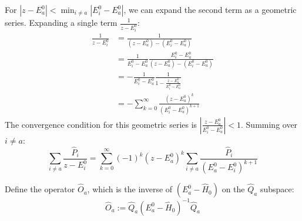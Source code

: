 For $|z-E_a^0|<\min_{i\neq a}|E_i^0-E_a^0|$, we can expand the second
term as a geometric series. Expanding a single term $\frac{1}{z-E_i^0}$:
\begin{align} \label{eq:geometric_series_expansion}
  \frac{1}{z-E_i^0}
  &= \frac{1}{(z-E_a^0) - (E_i^0 - E_a^0)} \\
  &= \frac{1}{E_i^0 - E_a^0} \frac{E_i^0 - E_a^0}{(z-E_a^0) -
  (E_i^0 - E_a^0)} \\
  &= -\frac{1}{E_i^0 - E_a^0} \frac{1}{1-\frac{z-E_a^0}{E_i^0-E_a^0}} \\
  &= -\sum_{k=0}^\infty \frac{(z-E_a^0)^k}{(E_i^0-E_a^0)^{k+1}}
\end{align}
The convergence condition for this geometric series is
$\left|\frac{z-E_a^0}{E_i^0-E_a^0}\right| < 1$.
Summing over $i \ne a$:
\begin{equation} \label{eq:G0_sum_expansion}
  \sum_{i\neq a}\frac{\hat P_i}{z-E_i^0}
  =\sum_{k=0}^\infty (-1)^k (z-E_a^0)^k
  \sum_{i\neq a}\frac{\hat P_i}{(E_a^0-E_i^0)^{k+1}}
\end{equation}

\begin{definition}
  Define the operator $\hat O_a$, which is the inverse of $(E_a^0 -
  \hat H_0)$ on the $\hat Q_a$ subspace:
  \begin{equation} \label{eq:kato_operator_O_a_definition}
    \hat O_a := \hat Q_a (E_a^0 - \hat H_0)^{-1} \hat Q_a
  \end{equation}
\end{definition}

